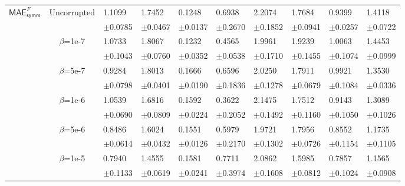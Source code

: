 \documentclass{article}
\begin{document}
\begin{table}[h!]
{\begin{tabularx}{\textwidth}{ccX X X X X X X X}
    
        \multirow{12}{*}{$\textsf{MAE}_\textsf{symm}^{F}$}
        
        &\multirow{2}{*}{Uncorrupted}
        &1.1099 & 1.7452 & 0.1248 & 0.6938 & 2.2074 & 1.7684 & 0.9399 & 1.4118\\
        &&\scriptsize$\pm$0.0785 & \scriptsize $\pm$0.0467 & \scriptsize $\pm$0.0137 & \scriptsize $\pm$0.2670 & \scriptsize $\pm$0.1852 & \scriptsize $\pm$0.0941 & \scriptsize $\pm$0.0257 & \scriptsize $\pm$0.0722\\
        \cline{3-10}\rule{0pt}{2.3ex}

        & \multirow{2}{*}{$\beta$=1e-7}
        & 1.0733 & 1.8067 & 0.1232 & 0.4565 & 1.9961 & 1.9239 & 1.0063 & 1.4453\\
        &&\scriptsize$\pm$0.1043 & \scriptsize $\pm$0.0760 & \scriptsize $\pm$0.0352 & \scriptsize $\pm$0.0538 & \scriptsize $\pm$0.1710 & \scriptsize $\pm$0.1455 & \scriptsize $\pm$0.1074 & \scriptsize $\pm$0.0999\\
        \cline{3-10}\rule{0pt}{2.3ex}

        & \multirow{2}{*}{$\beta$=5e-7}
        & 0.9284 & 1.8013 & 0.1666 & 0.6596 & 2.0250 & 1.7911 & 0.9921 & 1.3530\\
        &&\scriptsize$\pm$0.0798 & \scriptsize $\pm$0.0401 & \scriptsize $\pm$0.0190 & \scriptsize $\pm$0.1836 & \scriptsize $\pm$0.1278 & \scriptsize $\pm$0.0679 & \scriptsize $\pm$0.1084 & \scriptsize $\pm$0.0336\\
        \cline{3-10}\rule{0pt}{2.3ex}

        & \multirow{2}{*}{$\beta$=1e-6}
        & 1.0539 & 1.6816 & 0.1592 & 0.3622 & 2.1475 & 1.7512 & 0.9143 & 1.3089\\
        &&\scriptsize$\pm$0.0690 & \scriptsize $\pm$0.0809 & \scriptsize $\pm$0.0224 & \scriptsize $\pm$0.2052 & \scriptsize $\pm$0.1492 & \scriptsize $\pm$0.1160 & \scriptsize $\pm$0.1050 & \scriptsize $\pm$0.1026\\
        \cline{3-10}\rule{0pt}{2.3ex}

        & \multirow{2}{*}{$\beta$=5e-6}
        & 0.8486 & 1.6024 & 0.1551 & 0.5979 & 1.9721 & 1.7956 & 0.8552 & 1.1735\\
        &&\scriptsize$\pm$0.0614 & \scriptsize $\pm$0.0432 & \scriptsize $\pm$0.0126 & \scriptsize $\pm$0.2170 & \scriptsize $\pm$0.1302 & \scriptsize $\pm$0.0726 & \scriptsize $\pm$0.1154 & \scriptsize $\pm$0.1105\\
        \cline{3-10}\rule{0pt}{2.3ex}

        & \multirow{2}{*}{$\beta$=1e-5}
        & 0.7940 & 1.4555 & 0.1581 & 0.7711 & 2.0862 & 1.5985 & 0.7857 & 1.1565\\
        &&\scriptsize$\pm$0.1133 & \scriptsize $\pm$0.0619 & \scriptsize $\pm$0.0241 & \scriptsize $\pm$0.3974 & \scriptsize $\pm$0.1608 & \scriptsize $\pm$0.0812 & \scriptsize $\pm$0.1024 & \scriptsize $\pm$0.0908\\
      \bottomrule
\end{tabularx}
}
\end{table}
\end{document}
